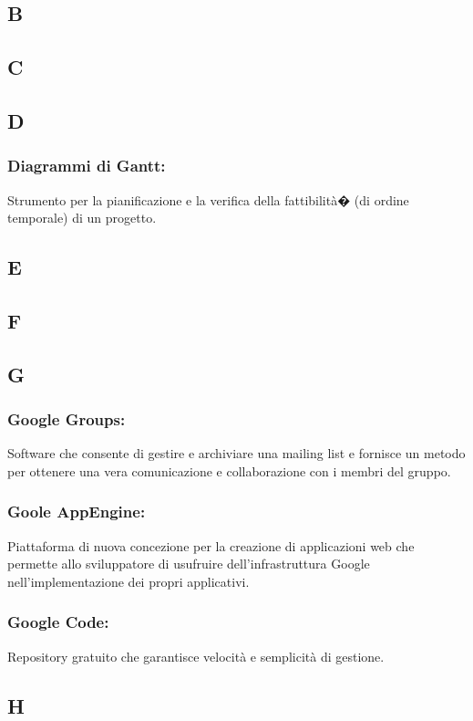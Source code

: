 \subsection*{B}
\subsection*{C}
\subsection*{D}
\subsubsection*{Diagrammi di Gantt:} Strumento per la pianificazione e la
verifica della fattibilit\`a� (di ordine temporale) di un progetto.
\subsection*{E}
\subsection*{F}
\subsection*{G}
\subsubsection*{Google Groups:} Software che consente di gestire e archiviare
una mailing list e fornisce un metodo per ottenere una vera comunicazione e collaborazione con i membri del gruppo.

\subsubsection*{Goole AppEngine:} Piattaforma di nuova concezione per
la creazione di applicazioni web che permette allo sviluppatore di usufruire dell'infrastruttura
Google nell'implementazione dei propri applicativi.

\subsubsection*{Google Code:} Repository gratuito che garantisce
velocit\`a e semplicit\`a di gestione.

\subsection*{H}
